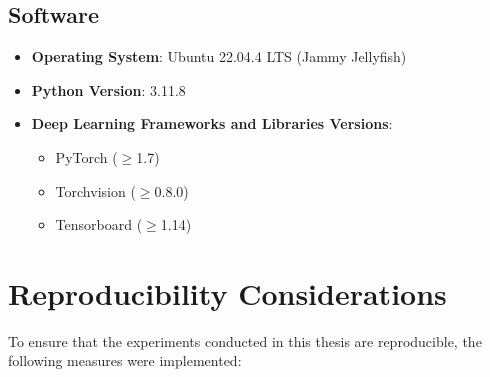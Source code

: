 \subsection{Software}
\begin{itemize}
    \item \textbf{Operating System}: Ubuntu 22.04.4 LTS (Jammy Jellyfish)
    \item \textbf{Python Version}: 3.11.8
    \item \textbf{Deep Learning Frameworks and Libraries Versions}:
    \begin{itemize}
        \item PyTorch (\(\geq\)1.7)
        \item Torchvision (\(\geq\)0.8.0)
        \item Tensorboard (\(\geq\)1.14)
    \end{itemize}
\end{itemize}



\section{Reproducibility Considerations}
To ensure that the experiments conducted in this thesis are reproducible, the following measures were implemented:


